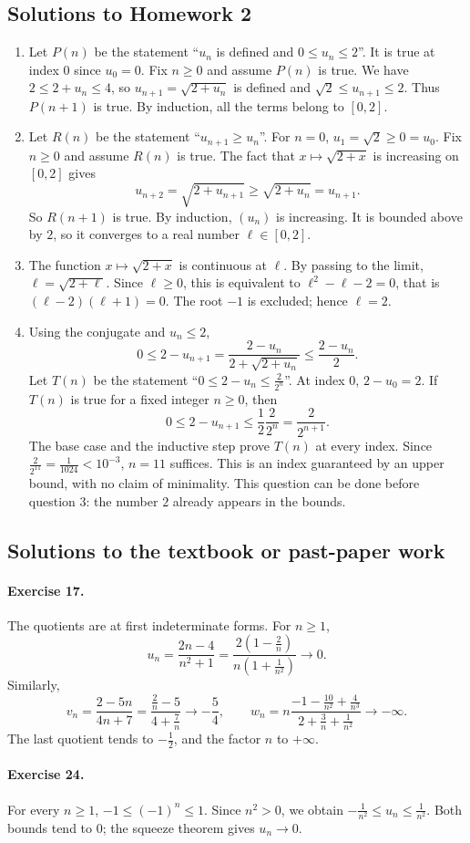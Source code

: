 \subsection{Solutions to Homework 2}\begin{enumerate}
\item Let $P(n)$ be the statement ``$u_n$ is defined and $0\le u_n\le2$''. It is true at index $0$ since $u_0=0$. Fix $n\ge0$ and assume $P(n)$ is true. We have $2\le2+u_n\le4$, so $u_{n+1}=\sqrt{2+u_n}$ is defined and $\sqrt2\le u_{n+1}\le2$. Thus $P(n+1)$ is true. By induction, all the terms belong to $[0,2]$.
\item Let $R(n)$ be the statement ``$u_{n+1}\ge u_n$''. For $n=0$, $u_1=\sqrt2\ge0=u_0$. Fix $n\ge0$ and assume $R(n)$ is true. The fact that $x\mapsto\sqrt{2+x}$ is increasing on $[0,2]$ gives
\[u_{n+2}=\sqrt{2+u_{n+1}}\ge\sqrt{2+u_n}=u_{n+1}.\]
So $R(n+1)$ is true. By induction, $(u_n)$ is increasing. It is bounded above by $2$, so it converges to a real number $\ell\in[0,2]$.
\item The function $x\mapsto\sqrt{2+x}$ is continuous at $\ell$. By passing to the limit, $\ell=\sqrt{2+\ell}$. Since $\ell\ge0$, this is equivalent to $\ell^2-\ell-2=0$, that is $(\ell-2)(\ell+1)=0$. The root $-1$ is excluded; hence $\ell=2$.
\item Using the conjugate and $u_n\le2$,
\[0\le2-u_{n+1}=\frac{2-u_n}{2+\sqrt{2+u_n}}\le\frac{2-u_n}{2}.\]
Let $T(n)$ be the statement ``$0\le2-u_n\le\frac{2}{2^n}$''. At index $0$, $2-u_0=2$. If $T(n)$ is true for a fixed integer $n\ge0$, then
\[0\le2-u_{n+1}\le\frac12\frac2{2^n}=\frac2{2^{n+1}}.\]
The base case and the inductive step prove $T(n)$ at every index. Since $\frac{2}{2^{11}}=\frac{1}{1024}<10^{-3}$, $n=11$ suffices. This is an index guaranteed by an upper bound, with no claim of minimality. This question can be done before question 3: the number $2$ already appears in the bounds.
\end{enumerate}

\subsection{Solutions to the textbook or past-paper work}\paragraph{Exercise 17.} The quotients are at first indeterminate forms. For $n\ge1$,
\[u_n=\frac{2n-4}{n^2+1}=\frac{2\left(1-\frac2n\right)}{n\left(1+\frac1{n^2}\right)}\longrightarrow0.\]
Similarly,
\[v_n=\frac{2-5n}{4n+7}=\frac{\frac2n-5}{4+\frac7n}\longrightarrow-\frac54,\qquad w_n=n\frac{-1-\frac{10}{n^2}+\frac4{n^3}}{2+\frac3n+\frac1{n^2}}\longrightarrow-\infty.\]
The last quotient tends to $-\frac12$, and the factor $n$ to $+\infty$.
\paragraph{Exercise 24.} For every $n\ge1$, $-1\le(-1)^n\le1$. Since $n^2>0$, we obtain $-\frac1{n^2}\le u_n\le\frac1{n^2}$. Both bounds tend to $0$; the squeeze theorem gives $u_n\to0$.

\fi

